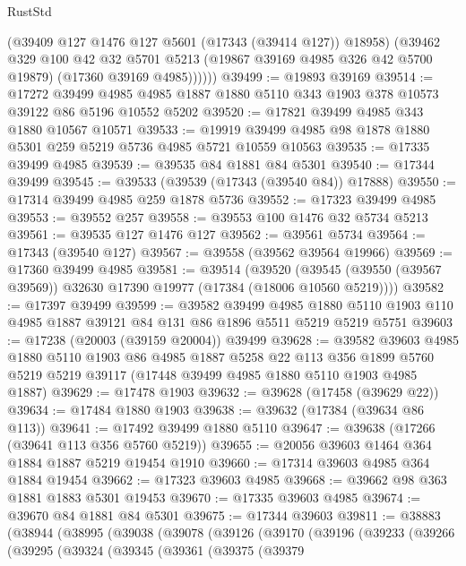\begin{lexlean}{RustStd}
\begin{coremodule}
            (@39409 @127 @1476 @127 @5601 (@17343 (@39414 @127)) @18958)
            (@39462
              @329
              @100
              @42
              @32
              @5701
              @5213
              (@19867 @39169 @4985 @326 @42 @5700 @19879)
              (@17360 @39169 @4985))))))
@39499 := @19893 @39169
@39514 := @17272
    @39499
    @4985
    @4985
    @1887
    @1880
    @5110
    @343
    @1903
    @378
    @10573
    @39122
    @86
    @5196
    @10552
    @5202
@39520 := @17821 @39499 @4985 @343 @1880 @10567 @10571
@39533 := @19919 @39499 @4985 @98 @1878 @1880 @5301 @259 @5219 @5736 @4985 @5721 @10559 @10563
@39535 := @17335 @39499 @4985
@39539 := @39535 @84 @1881 @84 @5301
@39540 := @17344 @39499
@39545 := @39533 (@39539 (@17343 (@39540 @84)) @17888)
@39550 := @17314 @39499 @4985 @259 @1878 @5736
@39552 := @17323 @39499 @4985
@39553 := @39552 @257
@39558 := @39553 @100 @1476 @32 @5734 @5213
@39561 := @39535 @127 @1476 @127
@39562 := @39561 @5734
@39564 := @17343 (@39540 @127)
@39567 := @39558 (@39562 @39564 @19966)
@39569 := @17360 @39499 @4985
@39581 := @39514
    (@39520 (@39545 (@39550 (@39567 @39569)) @32630 @17390 @19977 (@17384 (@18006 @10560 @5219))))
@39582 := @17397 @39499
@39599 := @39582
    @39499
    @4985
    @1880
    @5110
    @1903
    @110
    @4985
    @1887
    @39121
    @84
    @131
    @86
    @1896
    @5511
    @5219
    @5219
    @5751
@39603 := @17238 (@20003 (@39159 @20004)) @39499
@39628 := @39582
    @39603
    @4985
    @1880
    @5110
    @1903
    @86
    @4985
    @1887
    @5258
    @22
    @113
    @356
    @1899
    @5760
    @5219
    @5219
    @39117
    (@17448 @39499 @4985 @1880 @5110 @1903 @4985 @1887)
@39629 := @17478 @1903
@39632 := @39628 (@17458 (@39629 @22))
@39634 := @17484 @1880 @1903
@39638 := @39632 (@17384 (@39634 @86 @113))
@39641 := @17492 @39499 @1880 @5110
@39647 := @39638 (@17266 (@39641 @113 @356 @5760 @5219))
@39655 := @20056 @39603 @1464 @364 @1884 @1887 @5219 @19454 @1910
@39660 := @17314 @39603 @4985 @364 @1884 @19454
@39662 := @17323 @39603 @4985
@39668 := @39662 @98 @363 @1881 @1883 @5301 @19453
@39670 := @17335 @39603 @4985
@39674 := @39670 @84 @1881 @84 @5301
@39675 := @17344 @39603
@39811 := @38883
    (@38944
      (@38995
        (@39038
          (@39078
            (@39126
              (@39170
                (@39196
                  (@39233
                    (@39266
                      (@39295
                        (@39324
                          (@39345
                            (@39361
                              (@39375
                                (@39379

\end{coremodule}
\end{lexlean}
